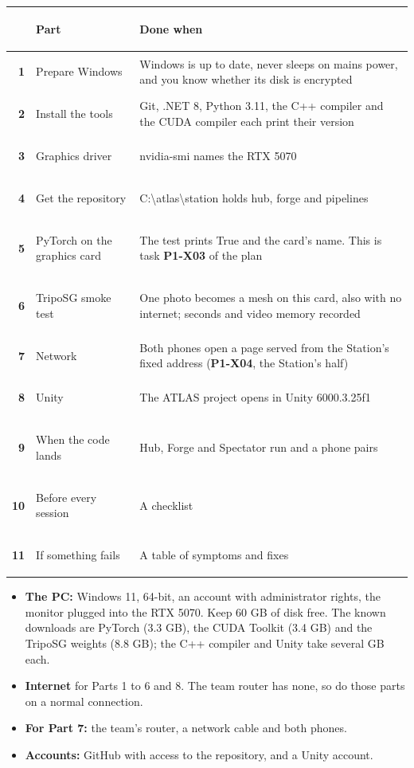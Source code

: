 \documentclass[10pt]{article}
\newcommand{\code}[1]{{\ttfamily\fontsize{8.8}{11}\selectfont #1}}
\newcommand{\h}[1]{\par\vspace{4mm}{\fontsize{11.5}{14}\selectfont\bfseries\color{ink}#1}\par\vspace{1.4mm}}
\newcommand{\pid}[1]{\textbf{#1}}
\begin{document}
\vspace{1mm}
{\small
\renewcommand{\arraystretch}{1.25}
\begin{tabular}{@{}>{\bfseries\color{accD}}r@{\hspace{3mm}}>{\bfseries\raggedright\arraybackslash}p{50mm}@{\hspace{3mm}}>{\raggedright\arraybackslash}p{110mm}@{}}
\toprule
 & Part & Done when\\
\midrule
1 & Prepare Windows & Windows is up to date, never sleeps on mains power, and you know whether its disk is encrypted\\
2 & Install the tools & Git, .NET 8, Python 3.11, the C++ compiler and the CUDA compiler each print their version\\
3 & Graphics driver & \code{nvidia-smi} names the RTX 5070\\
4 & Get the repository & \code{C:\textbackslash atlas\textbackslash station} holds \code{hub}, \code{forge} and \code{pipelines}\\
5 & PyTorch on the graphics card & The test prints \code{True} and the card's name. This is task \pid{P1-X03} of the plan\\
6 & TripoSG smoke test & One photo becomes a mesh on this card, also with no internet; seconds and video memory recorded\\
7 & Network & Both phones open a page served from the Station's fixed address (\pid{P1-X04}, the Station's half)\\
8 & Unity & The ATLAS project opens in Unity 6000.3.25f1\\
9 & When the code lands & Hub, Forge and Spectator run and a phone pairs\\
10 & Before every session & A checklist\\
11 & If something fails & A table of symptoms and fixes\\
\bottomrule
\end{tabular}}

\h{Before you start}
\begin{itemize}[leftmargin=5mm,itemsep=0.6mm,topsep=0mm]
\item \textbf{The PC:} Windows 11, 64-bit, an account with administrator rights, the monitor plugged into the RTX 5070.
      Keep 60 GB of disk free. The known downloads are PyTorch (3.3 GB), the CUDA Toolkit (3.4 GB) and the TripoSG
      weights (8.8 GB); the C++ compiler and Unity take several GB each.
\item \textbf{Internet} for Parts 1 to 6 and 8. The team router has none, so do those parts on a normal connection.
\item \textbf{For Part 7:} the team's router, a network cable and both phones.
\item \textbf{Accounts:} GitHub with access to the repository, and a Unity account.
\end{itemize}
\end{document}
